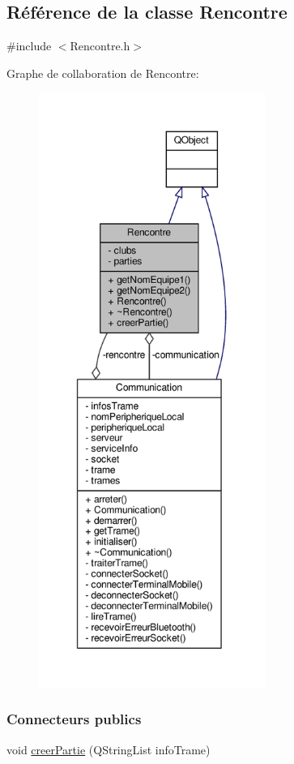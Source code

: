 \hypertarget{class_rencontre}{}\subsection{Référence de la classe Rencontre}
\label{class_rencontre}


{\ttfamily \#include $<$Rencontre.\+h$>$}



Graphe de collaboration de Rencontre\+:
\nopagebreak
\begin{figure}[H]
\begin{center}
\leavevmode
\includegraphics[height=550pt]{class_rencontre__coll__graph}
\end{center}
\end{figure}
\subsubsection*{Connecteurs publics}
\begin{DoxyCompactItemize}
\item 
void \hyperlink{class_rencontre_a8eb8eb61ed543925626e7680a1ecef5b}{creer\+Partie} (Q\+String\+List info\+Trame)
\end{DoxyCompactItemize}
